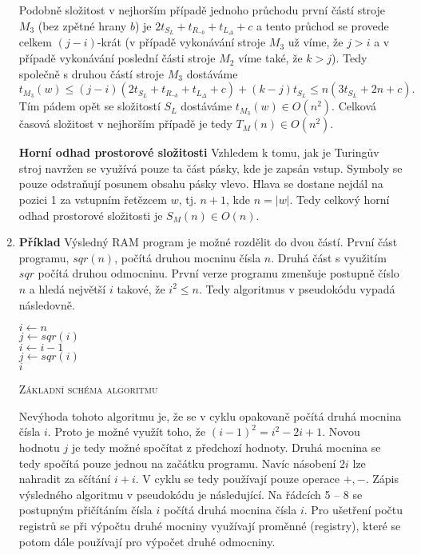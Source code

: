 \documentclass[a4paper,12pt]{article}
\begin{document}
\begin{enumerate}[label=\textbf{\arabic*}.]
     Podobně složitost v nejhorším případě jednoho průchodu první částí stroje $M_3$ (bez zpětné hrany $b$) je $2t_{S_L} + t_{R_{\neg b}} + t_{L_\Delta} + c$ a
     tento průchod se provede celkem $(j - i)$-krát (v případě vykonávání stroje $M_3$ už víme, že $j > i$ a v případě vykonávání poslední 
     části stroje $M_2$ víme také, že $k > j$). Tedy společně s druhou částí stroje $M_3$ dostáváme
     $$
      t_{M_3}(w) \leq (j - i)(2t_{S_L} + t_{R_{\neg b}} + t_{L_\Delta} + c) + (k - j)t_{S_L} \leq n(3t_{S_L} + 2n + c).
     $$
     Tím pádem opět se složitostí $S_L$ dostáváme $t_{M_3}(w) \in O(n^2)$. Celková časová složitost v 
     nejhorším případě je tedy $T_M(n) \in O(n^2)$.
     
     {\bfseries Horní odhad prostorové složitosti}
     Vzhledem k tomu, jak je Turingův stroj navržen se využívá pouze ta část pásky, kde je zapsán vstup. Symboly se pouze odstraňují posunem obsahu pásky
     vlevo. Hlava se dostane nejdál na pozici 1 za vstupním řetězcem $w$, tj. $n+1$, kde $n = |w|$. Tedy celkový horní 
     odhad prostorové složitosti je $S_M(n) \in O(n)$.

   \item {\bfseries Příklad}
   Výsledný RAM program je možné rozdělit do dvou částí. První část programu, $sqr(n)$, počítá druhou mocninu čísla $n$. Druhá část s využitím 
   $sqr$ počítá druhou odmocninu. První verze programu zmenšuje postupně číslo $n$ a hledá největší $i$ takové, že $i^2 \leq n$. Tedy algoritmus v 
   pseudokódu vypadá následovně.
   
    \begin{algorithm}[H]
 \SetNlSty{}{}{:}
 \SetNlSkip{-1.0em}
 \SetInd{0.5em}{0.5em}
 \BlankLine
 \Indentp{1.4em}
    $i \gets n$ \\
    $j \gets sqr(i)$ \\
     {
      $i \gets i - 1$ \\
      $j \gets sqr(i)$ \\
    }
    \Return $i$
 \caption{\textsc{Základní schéma algoritmu}}
 \end{algorithm}
  
  Nevýhoda tohoto algoritmu je, že se v cyklu opakovaně počítá druhá mocnina čísla $i$. Proto je možné využít toho, že
  $(i-1)^2 = i^2 - 2i + 1$. Novou hodnotu $j$ je tedy možné spočítat z předchozí hodnoty. Druhá mocnina se tedy spočítá
  pouze jednou na začátku programu. Navíc násobení $2i$ lze nahradit za sčítání $i + i$. V cyklu se tedy používají pouze
  operace $+,-$. Zápis výsledného algoritmu v pseudokódu je následující. Na řádcích 5 -- 8 se postupným přičítáním čísla $i$ 
  počítá druhá mocnina čísla $i$.
  Pro ušetření počtu registrů se při výpočtu druhé mocniny využívají proměnné (registry), které se potom dále používají pro 
  výpočet druhé odmocniny.
  

\end{enumerate}
\end{document}
